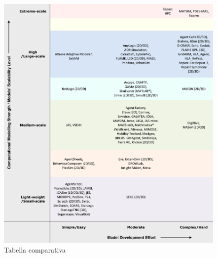 \begin{figure}[H]
    \begin{center}
        \includegraphics[width=\textwidth]{img/1-s2.0-S1574013716301198-gr1_lrg.jpg}
        \caption{Tabella comparativa \cite{ABAR201713}}
        \label{fig:Comparative_table}
    \end{center}
\end{figure}
